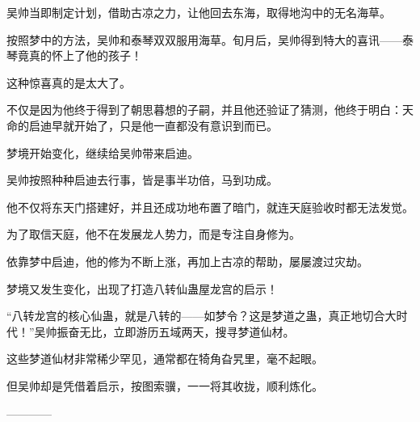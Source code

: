 \begin{this_body}
吴帅当即制定计划，借助古凉之力，让他回去东海，取得地沟中的无名海草。

按照梦中的方法，吴帅和泰琴双双服用海草。旬月后，吴帅得到特大的喜讯——泰琴竟真的怀上了他的孩子！

这种惊喜真的是太大了。

不仅是因为他终于得到了朝思暮想的子嗣，并且他还验证了猜测，他终于明白：天命的启迪早就开始了，只是他一直都没有意识到而已。

梦境开始变化，继续给吴帅带来启迪。

吴帅按照种种启迪去行事，皆是事半功倍，马到功成。

他不仅将东天门搭建好，并且还成功地布置了暗门，就连天庭验收时都无法发觉。

为了取信天庭，他不在发展龙人势力，而是专注自身修为。

依靠梦中启迪，他的修为不断上涨，再加上古凉的帮助，屡屡渡过灾劫。

梦境又发生变化，出现了打造八转仙蛊屋龙宫的启示！

“八转龙宫的核心仙蛊，就是八转的——如梦令？这是梦道之蛊，真正地切合大时代！”吴帅振奋无比，立即游历五域两天，搜寻梦道仙材。

这些梦道仙材非常稀少罕见，通常都在犄角旮旯里，毫不起眼。

但吴帅却是凭借着启示，按图索骥，一一将其收拢，顺利炼化。

------------

\end{this_body}

